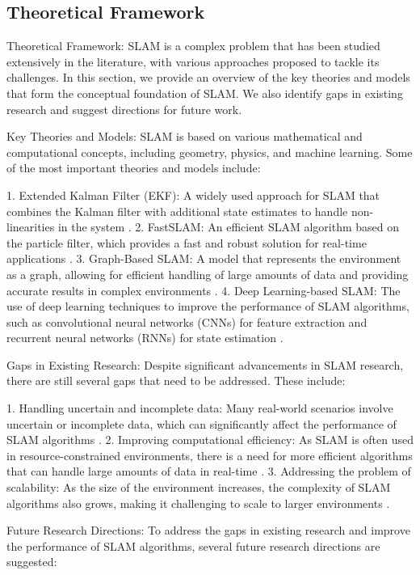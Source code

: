 \documentclass[conference]{IEEEtran}
\begin{document}
\subsection{Theoretical Framework}
Theoretical Framework:
SLAM is a complex problem that has been studied extensively in the literature, with various approaches proposed to tackle its challenges. In this section, we provide an overview of the key theories and models that form the conceptual foundation of SLAM. We also identify gaps in existing research and suggest directions for future work.

Key Theories and Models:
SLAM is based on various mathematical and computational concepts, including geometry, physics, and machine learning. Some of the most important theories and models include:

1. Extended Kalman Filter (EKF): A widely used approach for SLAM that combines the Kalman filter with additional state estimates to handle non-linearities in the system \cite{julier2004}.
2. FastSLAM: An efficient SLAM algorithm based on the particle filter, which provides a fast and robust solution for real-time applications \cite{hahnel2006}.
3. Graph-Based SLAM: A model that represents the environment as a graph, allowing for efficient handling of large amounts of data and providing accurate results in complex environments \cite{dissanayake2018}.
4. Deep Learning-based SLAM: The use of deep learning techniques to improve the performance of SLAM algorithms, such as convolutional neural networks (CNNs) for feature extraction and recurrent neural networks (RNNs) for state estimation \cite{wang2019}.

Gaps in Existing Research:
Despite significant advancements in SLAM research, there are still several gaps that need to be addressed. These include:

1. Handling uncertain and incomplete data: Many real-world scenarios involve uncertain or incomplete data, which can significantly affect the performance of SLAM algorithms \cite{srinivasa2018}.
2. Improving computational efficiency: As SLAM is often used in resource-constrained environments, there is a need for more efficient algorithms that can handle large amounts of data in real-time \cite{hutter2004}.
3. Addressing the problem of scalability: As the size of the environment increases, the complexity of SLAM algorithms also grows, making it challenging to scale to larger environments \cite{mur2017}.

Future Research Directions:
To address the gaps in existing research and improve the performance of SLAM algorithms, several future research directions are suggested:
\end{document}
